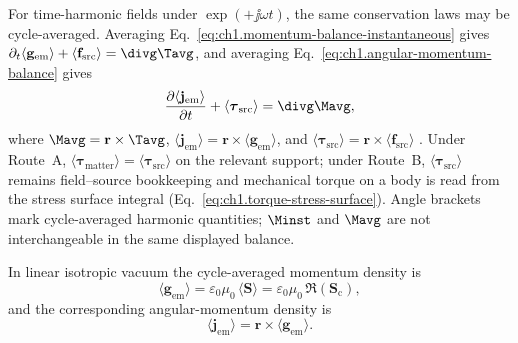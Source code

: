 For time-harmonic fields under $\exp(+\jj\omega t)$, the same conservation laws may be cycle-averaged. Averaging Eq.~\eqref{eq:ch1.momentum-balance-instantaneous} gives $\partial_t\langle\mathbf{g}_{\mathrm{em}}\rangle+\langle\mathbf{f}_{\mathrm{src}}\rangle=\divg\Tavg$, and averaging Eq.~\eqref{eq:ch1.angular-momentum-balance} gives
\begin{equation}
\label{eq:ch1.angular-momentum-balance-averaged}
\frac{\partial\langle\mathbf{j}_{\mathrm{em}}\rangle}{\partial t}+\langle\boldsymbol{\tau}_{\mathrm{src}}\rangle
=\divg\Mavg,
\end{equation}
where $\Mavg=\mathbf{r}\times\Tavg$, $\langle\mathbf{j}_{\mathrm{em}}\rangle=\mathbf{r}\times\langle\mathbf{g}_{\mathrm{em}}\rangle$, and $\langle\boldsymbol{\tau}_{\mathrm{src}}\rangle=\mathbf{r}\times\langle\mathbf{f}_{\mathrm{src}}\rangle$ \cite{stratton1941}. Under Route~A, $\langle\boldsymbol{\tau}_{\mathrm{matter}}\rangle=\langle\boldsymbol{\tau}_{\mathrm{src}}\rangle$ on the relevant support; under Route~B, $\langle\boldsymbol{\tau}_{\mathrm{src}}\rangle$ remains field--source bookkeeping and mechanical torque on a body is read from the stress surface integral (Eq.~\eqref{eq:ch1.torque-stress-surface}). Angle brackets mark cycle-averaged harmonic quantities; $\Minst$ and $\Mavg$ are not interchangeable in the same displayed balance.

In linear isotropic vacuum the cycle-averaged momentum density is
\begin{equation}
\label{eq:ch1.rotation-generator-split}
\langle\mathbf{g}_{\mathrm{em}}\rangle=\varepsilon_0\mu_0\,\langle\mathbf{S}\rangle
=\varepsilon_0\mu_0\,\Re(\mathbf{S}_\mathrm{c}),
\end{equation}
and the corresponding angular-momentum density is
\begin{equation}
\label{eq:ch1.angular-momentum-density}
\langle\mathbf{j}_{\mathrm{em}}\rangle=\mathbf{r}\times\langle\mathbf{g}_{\mathrm{em}}\rangle.
\end{equation}
\addtocounter{equation}{-1}\label{eq:ch1.angular-density-split}%

